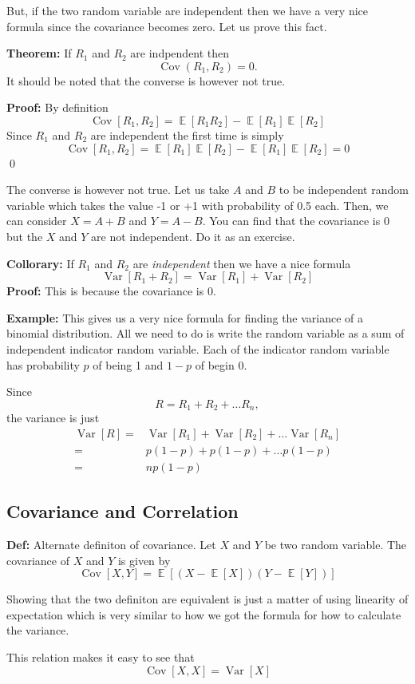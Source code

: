 \documentclass[a4paper, 12pt]{article}
\newcommand{\definition}{\vspace{1em}\noindent\textbf{Def:} }
\newcommand{\theorem}{\vspace{1em}\noindent\textbf{Theorem:} }
\newcommand{\collorary}{\vspace{1em}\noindent\textbf{Theorem:} }
\newcommand{\example}{\vspace{1em}\noindent\textbf{Example:} }
\renewcommand{\proof}{\vspace{0.5em}\noindent\textbf{Proof:} }
\renewcommand{\collorary}{\vspace{1em}\noindent\textbf{Collorary:} }
\newcommand{\qedd}{\qed\newline}
\DeclareMathOperator{\E}{\mathbb{E}}
\DeclareMathOperator{\Cov}{Cov}
\DeclareMathOperator{\Var}{Var}
\begin{document}
\begin{multicols}{2}
But, if the two random variable are independent then we have a very nice formula since the covariance becomes zero. Let us prove this fact.

\theorem If $R_1$ and $R_2$ are indpendent then
\[
	\Cov(R_1, R_2) = 0.
\]
It should be noted that the converse is however not true.

\proof By definition
\[
	\Cov[R_1, R_2] =  \E[R_1 R_2] - \E[R_1]\E[R_2]
\]
Since $R_1$ and $R_2$ are independent the first time is simply
\[
	\Cov[R_1, R_2] =  \E[R_1]\E[R_2] - \E[R_1]\E[R_2] = 0
\]
\qedd

The converse is however not true. Let us take $A$ and $B$  to be independent random variable which takes the value -1 or +1 with probability of 0.5 each. Then, we can consider $X=A+B$ and $Y=A-B$. You can find that the covariance is 0 but the $X$ and $Y$ are not independent. Do it as an exercise.

\collorary If $R_1$ and $R_2$ are \emph{independent} then we have a nice formula
\[
	\Var[R_1+R_2] = \Var[R_1] + \Var[R_2]
\]
\proof This is because the covariance is 0.

\example This gives us a very nice formula for finding the variance of a binomial distribution. All we need to do is write the random variable as a sum of independent indicator random variable. Each of the indicator random variable has probability $p$ of being 1 and $1-p$ of begin 0.

Since
\[
	R = R_1 + R_2 + \ldots R_n,
\]
the variance is just
\begin{align*}
	\Var[R] =& \Var[R_1] + \Var[R_2] + \ldots \Var[R_n]\\
	=& p(1-p) + p(1-p) + \ldots p(1-p)\\
	=& np(1-p)
\end{align*}

\subsection*{Covariance and Correlation}

\definition Alternate definiton of covariance. Let $X$ and $Y$ be two random variable. The covariance of $X$ and $Y$ is given by
\[
	\Cov[X,Y] = \E[ (X-\E[X])(Y-\E[Y])]
\]

Showing that the two definiton are equivalent is just a matter of using linearity of expectation which is very similar to how we got the formula for how to calculate the variance.

This relation makes it easy to see that
\[
	\Cov[X,X] = \Var[X]
\]


\end{multicols}
\end{document}
